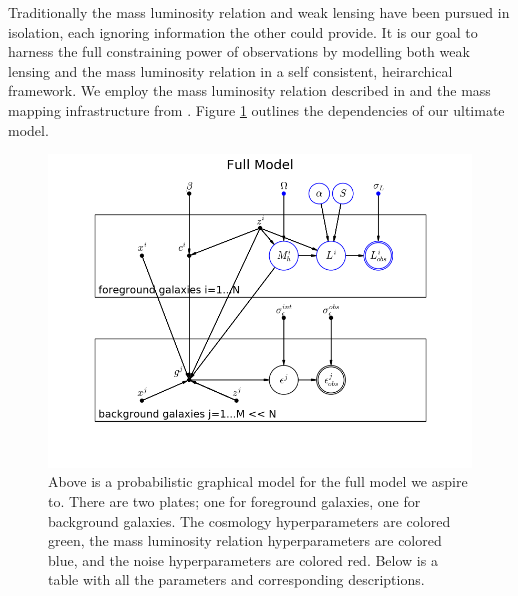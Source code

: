 \documentclass[\docopts]{\docclass}
\begin{document}
Traditionally the mass luminosity relation and weak lensing have been pursued in isolation, each ignoring information the other could provide. 
It is our goal to harness the full constraining power of observations by modelling both weak lensing and the mass luminosity relation in a self consistent, heirarchical framework.
We employ the mass luminosity relation described in \citet{reddick} and the mass mapping infrastructure from 
\citet{components}. 
Figure \ref{fig:ultimate_pgm} outlines the dependencies of our ultimate model.

\begin{figure}[h!]
\centering
\includegraphics[width=2.0\columnwidth]{full_pgm.png}
\caption{
Above is a probabilistic graphical model for the full model we aspire to. 
There are two plates; one for foreground galaxies, one for background galaxies. 
The cosmology hyperparameters are colored green, the mass luminosity relation hyperparameters are colored blue, and the noise hyperparameters are colored red.
Below is a table with all the parameters and corresponding descriptions.
\label{fig:ultimate_pgm}}


\end{figure}
\end{document}
